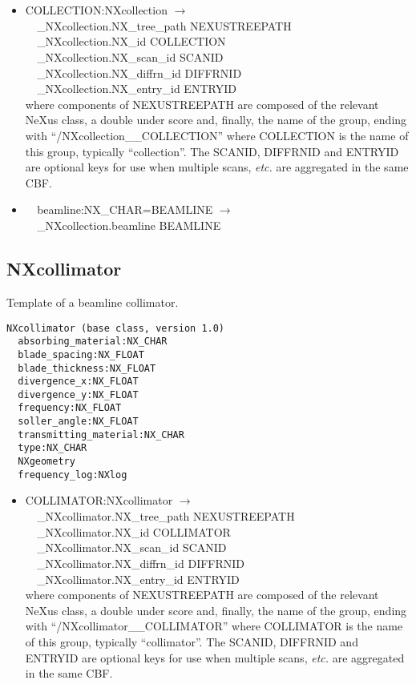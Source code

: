 \documentclass[11pt]{article}
\begin{document}
{{\begin{itemize}
\item{COLLECTION:NXcollection $\rightarrow$\\
\verb|  |\_NXcollection.NX\_tree\_path    NEXUSTREEPATH \\
\verb|  |\_NXcollection.NX\_id            COLLECTION\\
\verb|  |\_NXcollection.NX\_scan\_id      SCANID \\
\verb|  |\_NXcollection.NX\_diffrn\_id    DIFFRNID \\
\verb|  |\_NXcollection.NX\_entry\_id     ENTRYID \\
where components of NEXUSTREEPATH are composed of the
relevant NeXus class, a double under score and, finally, the
name of the group, ending with ``/NXcollection\_\_COLLECTION''
where COLLECTION is the name of this group, typically ``collection''.
The SCANID, DIFFRNID and ENTRYID are optional keys for use
when multiple scans, {\it etc.} are aggregated in the same CBF.}

\item{\verb|  |beamline:NX\_CHAR=BEAMLINE $\rightarrow$\\
\verb|  |\_NXcollection.beamline BEAMLINE}
\end{itemize}
\subsection{NXcollimator}

Template of a beamline collimator.

\begin{verbatim}
NXcollimator (base class, version 1.0)
  absorbing_material:NX_CHAR
  blade_spacing:NX_FLOAT
  blade_thickness:NX_FLOAT
  divergence_x:NX_FLOAT
  divergence_y:NX_FLOAT
  frequency:NX_FLOAT
  soller_angle:NX_FLOAT
  transmitting_material:NX_CHAR
  type:NX_CHAR
  NXgeometry
  frequency_log:NXlog
\end{verbatim}

\begin{itemize}

\item{COLLIMATOR:NXcollimator $\rightarrow$\\
\verb|  |\_NXcollimator.NX\_tree\_path    NEXUSTREEPATH \\
\verb|  |\_NXcollimator.NX\_id            COLLIMATOR\\
\verb|  |\_NXcollimator.NX\_scan\_id      SCANID \\
\verb|  |\_NXcollimator.NX\_diffrn\_id    DIFFRNID \\
\verb|  |\_NXcollimator.NX\_entry\_id     ENTRYID \\
where components of NEXUSTREEPATH are composed of the
relevant NeXus class, a double under score and, finally, the
name of the group, ending with ``/NXcollimator\_\_COLLIMATOR''
where COLLIMATOR is the name of this group, typically ``collimator''.
The SCANID, DIFFRNID and ENTRYID are optional keys for use
when multiple scans, {\it etc.} are aggregated in the same CBF.}


\end{itemize}}}
\end{document}
